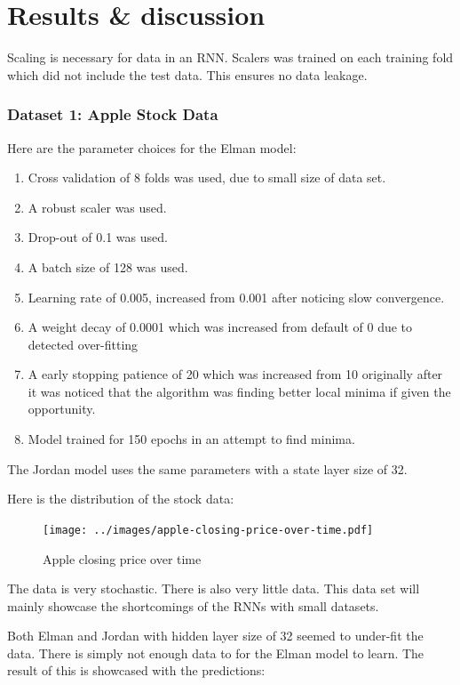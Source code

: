 \documentclass[conference]{IEEEtran}
\begin{document}
\section{Results \& discussion}

Scaling is necessary for data in an RNN. Scalers was trained on each training fold which did not include the test data. This ensures no data leakage.  

\subsubsection{Dataset 1: Apple Stock Data}

Here are the parameter choices for the Elman model:

\begin{enumerate}[]
	\item Cross validation of 8 folds was used, due to small size of data set.
	\item A robust scaler was used.
	\item Drop-out of 0.1 was used.
	\item A batch size of 128 was used.
	\item Learning rate of 0.005, increased from 0.001 after noticing slow convergence.
	\item A weight decay of 0.0001 which was increased from default of 0 due to detected over-fitting
	\item A early stopping patience of 20 which was increased from 10 originally after it was noticed that the algorithm was finding better local minima if given the opportunity.
	\item Model trained for 150 epochs in an attempt to find minima.
\end{enumerate}

The Jordan model uses the same parameters with a state layer size of 32.

Here is the distribution of the stock data:

\begin{figure}[H] 
	\centering
	\texttt{[image: ../images/apple-closing-price-over-time.pdf]}
	\caption{Apple closing price over time}
	\label{fig:apple-closing}
\end{figure}

The data is very stochastic. There is also very little data. This data set will mainly showcase the shortcomings of the RNNs with small datasets. 

Both Elman and Jordan with hidden layer size of 32 seemed to under-fit the data. There is simply not enough data to for the Elman model to learn. The result of this is showcased with the predictions:
\end{document}
